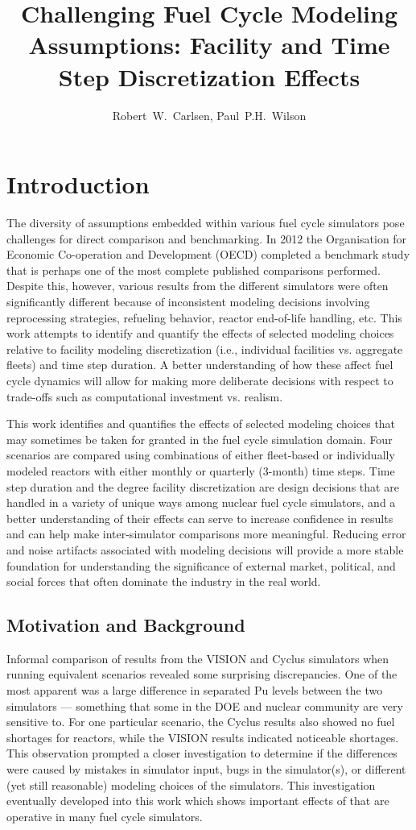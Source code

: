 \documentclass{style}
\title{Challenging Fuel Cycle Modeling Assumptions: Facility and Time Step Discretization Effects}
\author{Robert~W.~Carlsen, Paul~P.H.~Wilson}
\institute{University of Wisconsin - Madison, Department of Nuclear Engineering and Engineering Physics}
\date{}
\begin{document}

\section{Introduction}


The diversity of assumptions embedded within various fuel cycle simulators pose challenges for direct
comparison and benchmarking.  In 2012 the Organisation for
Economic Co-operation and Development (OECD) completed a benchmark study
\cite{oecd2012benchmark} that is perhaps one of the most complete published
comparisons performed.  Despite this, however, various results from the
different simulators were often significantly different because of inconsistent
modeling decisions involving reprocessing strategies, refueling behavior,
reactor end-of-life handling, etc.  This work attempts to identify and
quantify the effects of selected modeling choices relative to facility modeling
discretization (i.e., individual facilities vs. aggregate fleets) and time step
duration.  A better understanding of how these affect fuel cycle dynamics will
allow for making more deliberate decisions with respect to trade-offs such as
computational investment vs. realism.

This work identifies and quantifies the effects of selected modeling choices
that may sometimes be taken for granted in the fuel cycle simulation domain.
Four scenarios are compared using combinations of either fleet-based or
individually modeled reactors with either monthly or quarterly (3-month) time
steps.  Time step duration and the degree facility discretization are design
decisions that are handled in a variety of unique ways among nuclear fuel
cycle simulators, and a better understanding of their effects can serve to
increase confidence in results and can help make inter-simulator comparisons
more meaningful.  Reducing error and noise artifacts associated with modeling
decisions will provide a more stable foundation for understanding the
significance of external market, political, and social forces that often
dominate the industry in the real world.

\subsection{Motivation and Background}

Informal comparison of results from the VISION and Cyclus simulators when
running equivalent scenarios revealed some surprising discrepancies.  One of
the most apparent was a large difference in separated Pu levels between the
two simulators --- something that some in the DOE and nuclear community are
very sensitive to.  For one particular scenario, the Cyclus results also
showed no fuel shortages for reactors, while the VISION results indicated
noticeable shortages.  This observation prompted a closer investigation to
determine if the differences were caused by mistakes in simulator input, bugs
in the simulator(s), or different (yet still reasonable) modeling choices of the simulators.
This investigation eventually developed into this work which shows important
effects of that are operative in many fuel cycle simulators.
\end{document}
